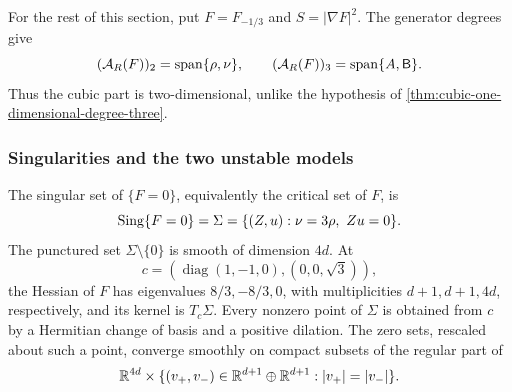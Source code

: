 For the rest of this section, put \(F=F_{-1/3}\) and
\(S=|\nabla F|^2\). The generator degrees give
\[
 (\mathcal A_R(F))_2=\operatorname{span}\{\rho,\nu\},\qquad
 (\mathcal A_R(F))_3=\operatorname{span}\{A,\mathsf{B}\}.
\]
Thus the cubic part is two-dimensional, unlike the hypothesis of
\cref{thm:cubic-one-dimensional-degree-three}.

\subsubsection{Singularities and the two unstable models}
\label{sec:nonradial-singularities}

\begin{lemma}\label{lem:nonradial-singularities}
The singular set of \(\{F=0\}\), equivalently the critical set of \(F\), is
\begin{equation}\label{eq:nonradial-critical-set}
 \operatorname{Sing}\{F=0\}=\Sigma=\{(Z,u):\nu=3\rho,\ Zu=0\}.
\end{equation}
The punctured set \(\Sigma\setminus\{0\}\) is smooth of
dimension \(4d\). At
\[
 c=(\operatorname{diag}(1,-1,0),(0,0,\sqrt3)),
\]
the Hessian of \(F\) has eigenvalues \(8/3,-8/3,0\), with
multiplicities \(d+1,d+1,4d\), respectively, and its kernel is
\(T_c\Sigma\). Every nonzero point of \(\Sigma\) is obtained
from \(c\) by a Hermitian change of basis and a positive dilation.
The zero sets, rescaled about such a point, converge smoothly on
compact subsets of the regular part of
\begin{equation}\label{eq:nonradial-transverse-cone}
 \mathbb R^{4d}\times\{(v_+,v_-)\in\mathbb R^{d+1}\oplus\mathbb R^{d+1}:
                           |v_+|=|v_-|\}.
\end{equation}
\end{lemma}


